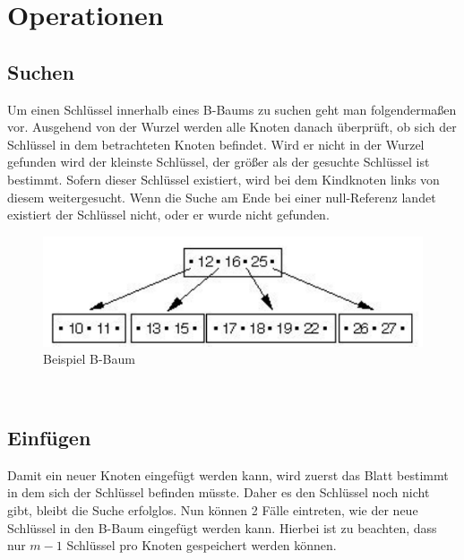 \chapter{Operationen}

\section{Suchen}

Um einen Schl\"ussel innerhalb eines B-Baums zu suchen geht man folgenderma\ss{}en vor. Ausgehend von der Wurzel werden alle Knoten danach \"uberpr\"uft, ob sich der Schl\"ussel in dem betrachteten Knoten befindet. Wird er nicht in der Wurzel gefunden wird der kleinste Schl\"ussel, der gr\"o\ss{}er als der gesuchte Schl\"ussel ist bestimmt. Sofern dieser Schl\"ussel existiert, wird bei dem Kindknoten links von diesem weitergesucht. Wenn die Suche am Ende bei einer null-Referenz landet existiert der Schl\"ussel nicht, oder er wurde nicht gefunden.
\\[0.5in]
\begin{figure}[h!] %
	\centering
	\includegraphics[width=0.7\linewidth]{images/Beispiel_Suche_B-Baum.pdf}
	\caption{Beispiel B-Baum}
	\label{Beispiel_Suche_B-Baum}
\end{figure}
\\[0.3in]
\section{Einf\"ugen}
Damit ein neuer Knoten eingef\"ugt werden kann, wird zuerst das Blatt bestimmt in dem sich der Schl\"ussel befinden m\"usste. Daher es den Schl\"ussel noch nicht gibt, bleibt die Suche erfolglos. Nun k\"onnen 2 F\"alle eintreten, wie der neue Schl\"ussel in den B-Baum eingef\"ugt werden kann. Hierbei ist zu beachten, dass nur $m-1$ Schl\"ussel pro Knoten gespeichert werden k\"onnen. 
